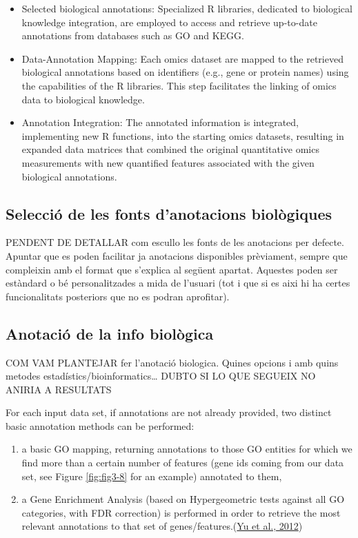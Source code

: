 \documentclass[a4paper, nobind]{templates/ociamthesis}
\begin{document}
\begin{itemize}
\item
  Selected biological annotations: Specialized R libraries, dedicated to biological knowledge integration, are employed to access and retrieve up-to-date annotations from databases such as GO and KEGG.
\item
  Data-Annotation Mapping: Each omics dataset are mapped to the retrieved biological annotations based on identifiers (e.g., gene or protein names) using the capabilities of the R libraries. This step facilitates the linking of omics data to biological knowledge.
\item
  Annotation Integration: The annotated information is integrated, implementing new R functions, into the starting omics datasets, resulting in expanded data matrices that combined the original quantitative omics measurements with new quantified features associated with the given biological annotations.
\end{itemize}

\hypertarget{biosources}{%
\subsection{Selecció de les fonts d'anotacions biològiques}\label{biosources}}

PENDENT DE DETALLAR com escullo les fonts de les anotacions per defecte.
Apuntar que es poden facilitar ja anotacions disponibles prèviament, sempre que compleixin amb el format que s'explica al següent apartat.
Aquestes poden ser estàndard o bé personalitzades a mida de l'usuari (tot i que si es aixi hi ha certes funcionalitats posteriors que no es podran aprofitar).

\clearpage

\hypertarget{bioannotation}{%
\subsection{Anotació de la info biològica}\label{bioannotation}}

COM VAM PLANTEJAR fer l'anotació biologica. Quines opcions i amb quins metodes estadístics/bioinformatics\ldots{}
DUBTO SI LO QUE SEGUEIX NO ANIRIA A RESULTATS

For each input data set, if annotations are not already provided, two distinct basic annotation methods can be performed:

\begin{enumerate}
\def\labelenumi{(\roman{enumi})}
\item
  a basic GO mapping, returning annotations to those GO entities for which we find more than a certain number of features (gene ids coming from our data set, see Figure \ref{fig:fig3-8} for an example) annotated to them,
\item
  a Gene Enrichment Analysis (based on Hypergeometric tests against all GO categories, with FDR correction) is performed in order to retrieve the most relevant annotations to that set of genes/features.(\protect\hyperlink{ref-yu_clusterprofiler_2012}{Yu et al., 2012})
\end{enumerate}
\end{document}
